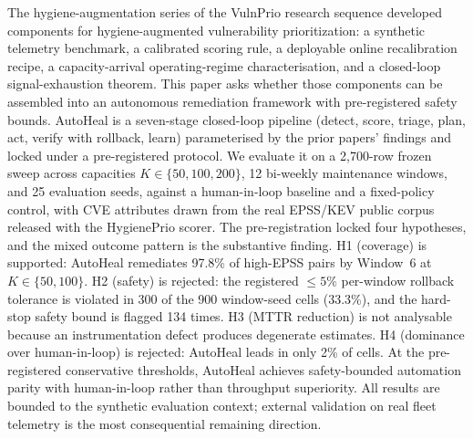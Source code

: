 The hygiene-augmentation series of the VulnPrio research sequence developed components
for hygiene-augmented vulnerability prioritization: a synthetic
telemetry benchmark, a calibrated scoring rule, a deployable online
recalibration recipe, a capacity-arrival operating-regime
characterisation, and a closed-loop signal-exhaustion theorem. This
paper asks whether those components can be assembled into an
autonomous remediation framework with pre-registered safety bounds.
AutoHeal is a seven-stage closed-loop pipeline (detect, score,
triage, plan, act, verify with rollback, learn) parameterised by the
prior papers' findings and locked under a pre-registered protocol.
We evaluate it on a 2{,}700-row frozen sweep across capacities
$K \in \{50, 100, 200\}$, 12 bi-weekly maintenance windows, and 25
evaluation seeds, against a human-in-loop baseline and a fixed-policy
control, with CVE attributes drawn from the real EPSS/KEV public
corpus released with the HygienePrio scorer. The pre-registration locked four
hypotheses, and the mixed outcome pattern is the substantive
finding. H1 (coverage) is supported: AutoHeal remediates 97.8\% of
high-EPSS pairs by Window~6 at $K \in \{50, 100\}$. H2 (safety) is
rejected: the registered $\leq 5\%$ per-window rollback tolerance is
violated in 300 of the 900 window-seed cells (33.3\%), and the
hard-stop safety bound is flagged 134 times. H3 (MTTR reduction) is
not analysable because an instrumentation defect produces degenerate
estimates. H4 (dominance over human-in-loop) is rejected: AutoHeal
leads in only 2\% of cells. At the pre-registered conservative
thresholds, AutoHeal achieves safety-bounded automation parity with
human-in-loop rather than throughput superiority. All results are
bounded to the synthetic evaluation context; external validation on
real fleet telemetry is the most consequential remaining direction.
